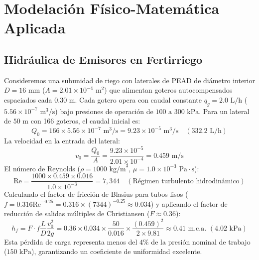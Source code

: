 \documentclass[spanish,letterpaper,oneside]{article}
\begin{document}
\section{Modelación Físico-Matemática Aplicada}

\subsection{Hidráulica de Emisores en Fertirriego}
Consideremos una subunidad de riego con laterales de PEAD de diámetro interior $D = 16\text{ mm}$ ($A = 2.01 \times 10^{-4}\text{ m}^2$) que alimentan goteros autocompensados espaciados cada $0.30\text{ m}$. Cada gotero opera con caudal constante $q_g = 2.0\text{ L/h}$ ($5.56 \times 10^{-7}\text{ m}^3\text{/s}$) bajo presiones de operación de $100\text{ a }300\text{ kPa}$.
Para un lateral de $50\text{ m}$ con 166 goteros, el caudal inicial es:
\begin{equation}
    Q_0 = 166 \times 5.56 \times 10^{-7}\text{ m}^3\text{/s} = 9.23 \times 10^{-5}\text{ m}^3\text{/s} \quad (332.2\text{ L/h})
\end{equation}
La velocidad en la entrada del lateral:
\begin{equation}
    v_0 = \frac{Q_0}{A} = \frac{9.23 \times 10^{-5}}{2.01 \times 10^{-4}} = 0.459\text{ m/s}
\end{equation}
El número de Reynolds ($\rho = 1000\text{ kg/m}^3$, $\mu = 1.0 \times 10^{-3}\text{ Pa}\cdot\text{s}$):
\begin{equation}
    \mathrm{Re} = \frac{1000 \times 0.459 \times 0.016}{1.0 \times 10^{-3}} = 7,344 \quad (\text{Régimen turbulento hidrodinámico})
\end{equation}
Calculando el factor de fricción de Blasius para tubos lisos ($f = 0.316 \mathrm{Re}^{-0.25} = 0.316 \times (7344)^{-0.25} \approx 0.034$) y aplicando el factor de reducción de salidas múltiples de Christiansen ($F \approx 0.36$):
\begin{equation}
    h_f = F \cdot f \frac{L}{D} \frac{v_0^2}{2g} = 0.36 \times 0.034 \times \frac{50}{0.016} \times \frac{(0.459)^2}{2 \times 9.81} \approx 0.41\text{ m.c.a. } (4.02\text{ kPa})
\end{equation}
Esta pérdida de carga representa menos del $4\%$ de la presión nominal de trabajo ($150\text{ kPa}$), garantizando un coeficiente de uniformidad excelente.
\end{document}
